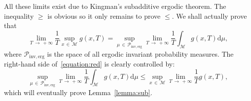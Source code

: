 \documentclass[10pt]{amsart}
\theoremstyle{definition}\newtheorem{defi}[theo]{Definition}\newtheorem{rema}[theo]{Remark}\newtheorem{exam}[theo]{Example}\newtheorem{exem}[theo]{Example}\newtheorem{nota}[theo]{Notation}
\newcommand{\mc}{\mathcal}
\newcommand{\M}{\mathcal{M}}
\newcommand{\dd}{\mathrm{d}}
\newcommand{\inverg}{\mathrm{inv,erg}}
\begin{document}
All these limits exist due to Kingman's subadditive ergodic theorem. The inequality $\geq$ is obvious so it only remains to prove $\leq$. We shall actually prove that
\begin{equation}\label{equation:red}
\lim_{T\,\rightarrow \,+\infty} \frac{1}{T} \sup_{x\,\in\,\M} g(x,T) = \sup_{\mu\,\in\,\mc{P}_{\inverg}} \lim_{T\,\rightarrow\,+\infty} \frac{1}{T}\int_{\M} g(x,T) \dd\mu,
\end{equation}
where $\mc{P}_{\inverg}$ is the space of all ergodic invariant probability measures. The right-hand side of~\eqref{equation:red} is clearly controlled by:
\[
\sup_{\mu\,\in\,\mc{P}_{\inverg}} \lim_{T\, \rightarrow\,+\infty} \frac{1}{T}\int_{\M} g(x,T) \dd\mu \leq \sup_{x\,\in\,\M} \lim_{T \,\rightarrow\,+\infty} \frac{1}{T} g(x,T),
\]
which will eventually prove Lemma~\ref{lemma:sub}.
\end{document}
